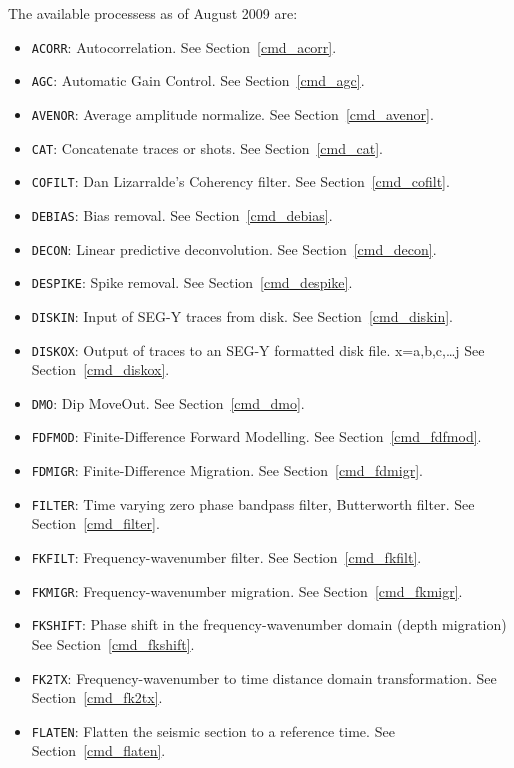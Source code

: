 The available processess as of August 2009 are:

\begin{itemize}
    \item \texttt{ACORR}: Autocorrelation. See Section~\ref{cmd_acorr}.
    \item \texttt{AGC}: Automatic Gain Control. See Section~\ref{cmd_agc}.
    \item \texttt{AVENOR}: Average amplitude normalize. See Section~\ref{cmd_avenor}.
    \item \texttt{CAT}: Concatenate traces or \glspl{shot}. See Section~\ref{cmd_cat}.
    \item \texttt{COFILT}: Dan Lizarralde's Coherency filter. See Section~\ref{cmd_cofilt}.
    \item \texttt{DEBIAS}: Bias removal. See Section~\ref{cmd_debias}.
    \item \texttt{DECON}: Linear predictive deconvolution. See Section~\ref{cmd_decon}.
    \item \texttt{DESPIKE}: Spike removal. See Section~\ref{cmd_despike}.
    \item \texttt{DISKIN}: Input of SEG-Y traces from disk. See Section~\ref{cmd_diskin}.
    \item \texttt{DISKOX}: Output of traces to an SEG-Y formatted disk file. x=a,b,c,{\ldots}j See Section~\ref{cmd_diskox}.
    \item \texttt{DMO}: Dip MoveOut. See Section~\ref{cmd_dmo}.
    \item \texttt{FDFMOD}: Finite-Difference Forward Modelling. See Section~\ref{cmd_fdfmod}.
    \item \texttt{FDMIGR}: Finite-Difference Migration. See Section~\ref{cmd_fdmigr}.
    \item \texttt{FILTER}: Time varying zero phase bandpass filter, Butterworth filter. See Section~\ref{cmd_filter}.
    \item \texttt{FKFILT}: Frequency-wavenumber filter. See Section~\ref{cmd_fkfilt}.
    \item \texttt{FKMIGR}: Frequency-wavenumber migration. See Section~\ref{cmd_fkmigr}.
    \item \texttt{FKSHIFT}: Phase shift in the frequency-wavenumber domain (depth migration) See Section~\ref{cmd_fkshift}.
    \item \texttt{FK2TX}: Frequency-wavenumber to time distance domain transformation. See Section~\ref{cmd_fk2tx}.
    \item \texttt{FLATEN}: Flatten the seismic section to a reference time. See Section~\ref{cmd_flaten}.

\end{itemize}
